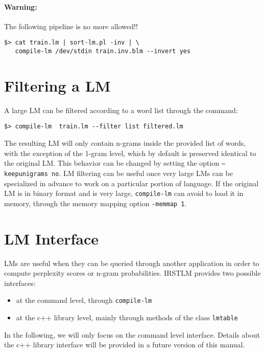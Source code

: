 \documentclass[11pt]{article}
\newcommand{\COMMENT}[1]{}
\begin{document}
\paragraph{Warning:} The following pipeline is no more allowed!!

\COMMENT{
or with the following pipeline:
}
\begin{verbatim}
$> cat train.lm | sort-lm.pl -inv | \
   compile-lm /dev/stdin train.inv.blm --invert yes
\end{verbatim}

\newpage
\section{Filtering a LM}
A large LM can be filtered according to a word list through the command:

\begin{verbatim}
$> compile-lm  train.lm --filter list filtered.lm
\end{verbatim}
The resulting LM will only contain n-grams inside the provided list of words,
with the exception of the 1-gram level, which by default is preserved identical
to the original LM. This behavior can be changed by setting the option 
{\tt --keepunigrams no}.  LM filtering can be useful once very large LMs can
be specialized in advance to work on a particular portion of language.
\noindent
If the original LM is in binary format and is very large, {\tt compile-lm} can avoid to load it in memory,
through the memory mapping option {\tt -memmap 1}.







\newpage
\section{LM Interface}
LMs are useful when they can be queried through another application in order to compute 
perplexity scores or n-gram probabilities. IRSTLM provides two possible interfaces: 
\begin{itemize}
\item at the command level, through  {\tt compile-lm}
\item at the c++ library level, mainly through methods of the class {\tt lmtable}
\end{itemize}

\noindent
In the following, we will only focus on the command level interface. Details about
the c++ library interface will be provided in a future version of this manual.  
\end{document}

